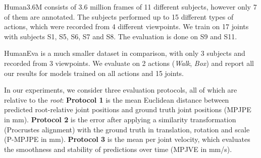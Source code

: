 \documentclass[letterpaper]{article}
\begin{document}
Human3.6M consists of 3.6 million frames of 11 different subjects, however only 7 of them are annotated. The subjects performed up to 15 different types of actions, which were recorded from 4 different viewpoints. We train on 17 joints with subjects S1, S5, S6, S7 and S8. The evaluation is done on S9 and S11.

HumanEva is a much smaller dataset in comparison, with only 3 subjects and recorded from 3 viewpoints. We evaluate on 2 actions (\textit{Walk}, \textit{Box}) and report all our results for models trained on all actions and 15 joints.

In our experiments, we consider three evaluation protocols, all of which are relative to the \textit{root}: \textbf{Protocol 1} is the mean Euclidean distance between predicted root-relative joint positions and ground truth joint positions (MPJPE in mm). \textbf{Protocol 2} is the error after applying a similarity transformation (Procrustes alignment) with the ground truth in translation, rotation and scale (P-MPJPE in mm). \textbf{Protocol 3} is the mean per joint velocity, which evaluates the smoothness and stability of predictions over time (MPJVE in mm/s).
\end{document}
